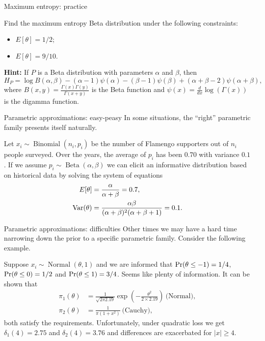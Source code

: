 \begin{frame}{Maximum entropy: practice}
\begin{exercise}
 \label{exerc:maxent_beta}
 Find the maximum entropy Beta distribution under the following constraints:
 \begin{itemize}
  \item $E[\theta] = 1/2$;
  \item $E[\theta] = 9/10$.
 \end{itemize}
\end{exercise}
\textbf{Hint:} If $P$ is a Beta distribution with parameters $\alpha$ and $\beta$, then
$$H_P = \log B(\alpha, \beta) -(\alpha-1)\psi(\alpha) - (\beta-1)\psi(\beta) + (\alpha + \beta -2)\psi(\alpha + \beta),$$
where $B(x, y) = \frac{\Gamma(x) \Gamma(y)}{\Gamma(x + y)}$ is the Beta function and $\psi(x) = \frac{d}{dx} \log(\Gamma(x))$ is the digamma function.
\end{frame}
\begin{frame}{Parametric approximations: easy-peasy}
In some situations, the ``right'' parametric family presents itself naturally.
\begin{example}
 Let $x_i \sim \operatorname{Binomial}(n_i, p_i)$ be the number of Flamengo supporters out of $n_i$ people surveyed. 
 Over the years, the average of $p_i$ has been $0.70$ with variance $0.1$. 
 If we assume $p_i \sim \operatorname{Beta}(\alpha, \beta)$ we can elicit an informative distribution based on historical data by solving the system of equations
 \begin{align*}
  E[\theta] &= \frac{\alpha}{\alpha + \beta} = 0.7,\\
  \operatorname{Var}(\theta) &= \frac{\alpha\beta}{(\alpha + \beta)^2(\alpha +\beta +1)} = 0.1.
 \end{align*}
\end{example}
\end{frame}
\begin{frame}{Parametric approximations: difficulties}
 Other times we may have a hard time narrowing down the prior to a specific parametric family.
 Consider the following example.
 \begin{example}
  Suppose $x_i \sim \operatorname{Normal}(\theta, 1)$ and we are informed that $\operatorname{Pr}(\theta \leq -1) = 1/4$, $\operatorname{Pr}(\theta \leq 0) = 1/2$ and $\operatorname{Pr}(\theta \leq 1) = 3/4$.
Seems like plenty of information.
It can be shown that 
\begin{align*}
 \pi_1(\theta) &= \frac{1}{\sqrt{2\pi 2.19}}\exp\left(-\frac{\theta^2}{2\times2.19}\right) \: \text{(Normal)},\\
 \pi_2(\theta) &= \frac{1}{\pi (1 + x^2)} \: \text{(Cauchy)},
\end{align*}
both satisfy the requirements.
Unfortunately, under quadratic loss we get $\delta_1(4) = 2.75$ and $\delta_2(4) = 3.76$ and differences are exacerbated for $|x|\geq 4$. 
\end{example}
\end{frame}
